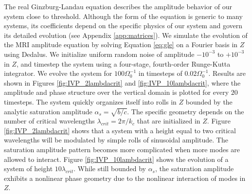 \documentclass[twocolumn]{aastex61}
\begin{document}
The real Ginzburg-Landau equation describes the amplitude behavior of our system close to threshold. Although the form of the equation is generic to many systems, its coefficients depend on the specific physics of our system and govern its detailed evolution (see Appendix \ref{app:matrices}). We simulate the evolution of the MRI amplitude equation by solving Equation \ref{eq:gle} on a Fourier basis in $Z$ using Dedalus. We initialize uniform random noise of amplitude $-10^{-3}$ to $+10^{-3}$ in $Z$, and timestep the system using a four-stage, fourth-order Runge-Kutta integrator. We evolve the system for $100 \Omega_0^{-1}$ in timesteps of $0.02 \Omega_0^{-1}$. Results are shown in Figures \ref{fig:IVP_2lambdacrit} and \ref{fig:IVP_10lambdacrit}, where the amplitude and phase structure over the vertical domain is plotted for every $20$ timesteps. The system quickly organizes itself into rolls in $Z$ bounded by the analytic saturation amplitude $\alpha_s = \sqrt{b/c}$. The specific geometry depends on the number of critical wavelengths $\lambda_{crit} = 2\pi/k_c$ that are initialized in $Z$. Figure \ref{fig:IVP_2lambdacrit} shows that a system with a height equal to two critical wavelengths will be modulated by simple rolls of sinusoidal amplitude. The saturation amplitude pattern becomes more complicated when more modes are allowed to interact. Figure \ref{fig:IVP_10lambdacrit} shows the evolution of a system of height $10 \lambda_{crit}$. While still bounded by $\alpha_s$, the saturation amplitude exhibits a nonlinear phase geometry due to the nonlinear interaction of modes in $Z$. 

\end{document}

